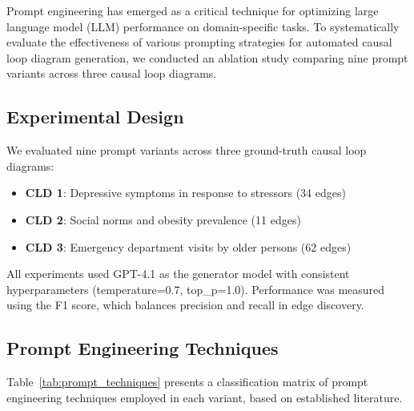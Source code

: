 Prompt engineering has emerged as a critical technique for optimizing large language model (LLM) performance on domain-specific tasks. To systematically evaluate the effectiveness of various prompting strategies for automated causal loop diagram generation, we conducted an ablation study comparing nine prompt variants across three causal loop diagrams.

\subsection{Experimental Design}

We evaluated nine prompt variants across three ground-truth causal loop diagrams:
\begin{itemize}[noitemsep]
    \item \textbf{CLD 1}: Depressive symptoms in response to stressors (34 edges)
    \item \textbf{CLD 2}: Social norms and obesity prevalence (11 edges)
    \item \textbf{CLD 3}: Emergency department visits by older persons (62 edges)
\end{itemize}

All experiments used GPT-4.1 as the generator model with consistent hyperparameters (temperature=0.7, top\_p=1.0). Performance was measured using the F1 score, which balances precision and recall in edge discovery.

\subsection{Prompt Engineering Techniques}

Table~\ref{tab:prompt_techniques} presents a classification matrix of prompt engineering techniques employed in each variant, based on established literature.

